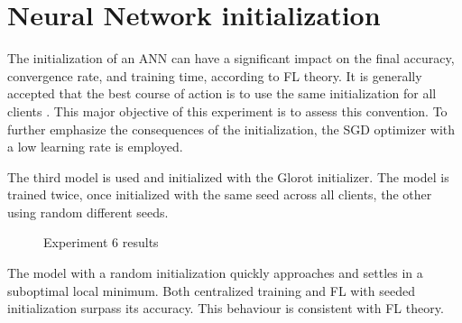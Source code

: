 \section{Neural Network initialization}
The initialization of an ANN can have a significant impact on the final accuracy, convergence rate, and training time, according to FL theory. It is generally accepted that the best course of action is to use the same initialization for all clients \cite{FL-original-paper}.  This major objective of this experiment is to assess this convention. To further emphasize the consequences of the initialization, the SGD optimizer with a low learning rate is employed.
\begin{table}[H]
    \center
    \caption[Experiment 6 parameters]{Experiment 6 parameters}
    \label{table:Experiment 6 parameters}
\end{table}
The third model is used and initialized with the Glorot initializer. The model is trained twice, once initialized with the same seed across all clients, the other using random different seeds.
\begin{figure}[H]
    \center
    
    \caption[Experiment 6 results]{Experiment 6 results}
    \label{fig:Experiment 6 results}
\end{figure}
The model with a random initialization quickly approaches and settles in a suboptimal local minimum. Both centralized training and FL with seeded initialization surpass its accuracy. This behaviour is consistent with FL theory.

